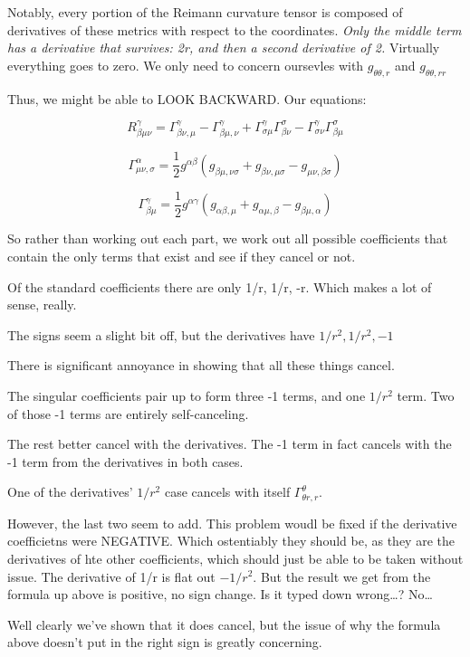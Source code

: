 \documentclass[landscape,letterpaper,10pt,english]{article}
\begin{document}
Notably, every portion of the Reimann curvature tensor is composed of
derivatives of these metrics with respect to the coordinates. \emph{Only
the middle term has a derivative that survives: 2r, and then a second
derivative of 2.} Virtually everything goes to zero. We only need to
concern oursevles with \(g_{\theta\theta,r}\) and
\(g_{\theta\theta,rr}\)

Thus, we might be able to LOOK BACKWARD. Our equations:

\[ R^\gamma_{\beta\mu\nu} = \Gamma^\gamma_{\beta\nu,\mu} - \Gamma^\gamma_{\beta\mu,\nu} + \Gamma^\gamma_{\sigma\mu} \Gamma^\sigma_{\beta\nu} - \Gamma^\gamma_{\sigma\nu} \Gamma^\sigma_{\beta\mu}  \]

\[ \Gamma^\alpha_{\mu\nu,\sigma}  = \frac12 g^{\alpha\beta} \left( g_{\beta\mu,\nu\sigma} + g_{\beta\nu,\mu\sigma} - g_{\mu\nu,\beta\sigma} \right) \]

\[ \Gamma^\gamma_{\beta\mu} = \frac{1}{2} g^{\alpha\gamma} (g_{\alpha\beta,\mu} + g_{\alpha\mu,\beta} - g_{\beta\mu,\alpha})  \]

    So rather than working out each part, we work out all possible
coefficients that contain the only terms that exist and see if they
cancel or not.

Of the standard coefficients there are only 1/r, 1/r, -r. Which makes a
lot of sense, really.

The signs seem a slight bit off, but the derivatives have
\(1/r^2, 1/r^2, -1\)

There is significant annoyance in showing that all these things cancel.

The singular coefficients pair up to form three -1 terms, and one
\(1/r^2\) term. Two of those -1 terms are entirely self-canceling.

The rest better cancel with the derivatives. The -1 term in fact cancels
with the -1 term from the derivatives in both cases.

One of the derivatives' \(1/r^2\) case cancels with itself
\(\Gamma^\theta_{\theta r,r}\).

However, the last two seem to add. This problem woudl be fixed if the
derivative coefficietns were NEGATIVE. Which ostentiably they should be,
as they are the derivatives of hte other coefficients, which should just
be able to be taken without issue. The derivative of 1/r is flat out
\(-1/r^2\). But the result we get from the formula up above is positive,
no sign change. Is it typed down wrong\ldots? No\ldots{}

Well clearly we've shown that it does cancel, but the issue of why the
formula above doesn't put in the right sign is greatly concerning.
\end{document}
